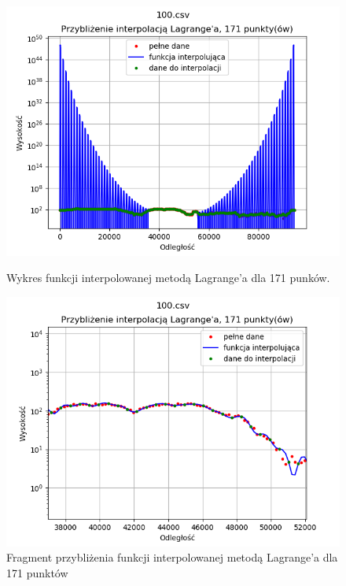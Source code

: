 \documentclass{article} %
\begin{document}
\begin{figure}[h!]
    \centering
    \begin{minipage}[b]{0.4\textwidth}
        \includegraphics[width=\textwidth]{lagrange/rozna_dokladnosc/100_171punktow_cale.png}
        \caption{Wykres funkcji interpolowanej metodą Lagrange'a dla 171 punków.}
    \end{minipage}
    \hfill
    \begin{minipage}[b]{0.4\textwidth}
        \includegraphics[width=\textwidth]{lagrange/rozna_dokladnosc/100_171_zb.png}
        \caption{Fragment przybliżenia funkcji interpolowanej metodą Lagrange'a dla 171 punktów}
    \end{minipage}
    \begin{minipage}[b]{0.4\textwidth}

\end{minipage}
\end{figure}
\end{document}
